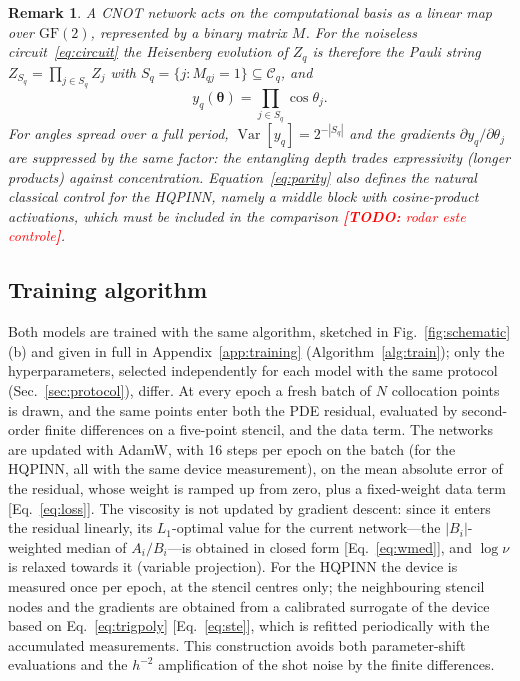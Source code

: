 \documentclass[floatfix,aps,pra,twocolumn,showpacs,superscriptaddress,10pt,nofootinbib]{revtex4-2}
\newif\ifshowtodos \showtodostrue
\newcommand{\TODO}[1]{\ifshowtodos\textcolor{red}{\textbf{[TODO:} #1\textbf{]}}\fi}
\newtheorem{remark}{Remark}
\begin{document}
\begin{remark}\label{rem:parity}
A CNOT network acts on the computational basis as a linear map over $\mathrm{GF}(2)$, represented by a binary matrix $M$. For the noiseless circuit~\eqref{eq:circuit} the Heisenberg evolution of $Z_q$ is therefore the Pauli string $Z_{S_q}=\prod_{j\in S_q}Z_j$ with $S_q=\{j: M_{qj}=1\}\subseteq\mathcal C_q$, and
\begin{equation}
  y_q(\bm\theta)=\prod_{j\in S_q}\cos\theta_j .
  \label{eq:parity}
\end{equation}
For angles spread over a full period, $\operatorname{Var}[y_q]=2^{-|S_q|}$ and the gradients $\partial y_q/\partial\theta_j$ are suppressed by the same factor: the entangling depth trades expressivity (longer products) against concentration. Equation~\eqref{eq:parity} also defines the natural \emph{classical control} for the HQPINN, namely a middle block with cosine-product activations, which must be included in the comparison \TODO{rodar este controle}.
\end{remark}

\subsection{Training algorithm}\label{sec:training}

Both models are trained with the same algorithm, sketched in Fig.~\ref{fig:schematic}(b) and given in full in Appendix~\ref{app:training} (Algorithm~\ref{alg:train}); only the hyperparameters, selected independently for each model with the same protocol (Sec.~\ref{sec:protocol}), differ. At every epoch a fresh batch of $N$ collocation points is drawn, and the same points enter both the PDE residual, evaluated by second-order finite differences on a five-point stencil, and the data term. The networks are updated with AdamW, with 16 steps per epoch on the batch (for the HQPINN, all with the same device measurement), on the mean absolute error of the residual, whose weight is ramped up from zero, plus a fixed-weight data term [Eq.~\eqref{eq:loss}]. The viscosity is not updated by gradient descent: since it enters the residual linearly, its $L_1$-optimal value for the current network---the $|B_i|$-weighted median of $A_i/B_i$---is obtained in closed form [Eq.~\eqref{eq:wmed}], and $\log\nu$ is relaxed towards it (variable projection). For the HQPINN the device is measured once per epoch, at the stencil centres only; the neighbouring stencil nodes and the gradients are obtained from a calibrated surrogate of the device based on Eq.~\eqref{eq:trigpoly} [Eq.~\eqref{eq:ste}], which is refitted periodically with the accumulated measurements. This construction avoids both parameter-shift evaluations and the $h^{-2}$ amplification of the shot noise by the finite differences.
\end{document}
